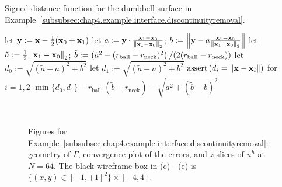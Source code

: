 \begin{algorithm}[htbp]
\caption{Signed distance function for the dumbbell surface in Example~\ref{subsubsec:chap4.example.interface.discontinuityremoval}.}
\label{alg:chap4.examples.interface.dumbbell}
\begin{algorithmic}[1]
\STATE {}
\STATE {}
\STATE let $\mathbf{y} := \mathbf{x} - \frac{1}{2} (\mathbf{x}_0 + \mathbf{x}_1)$
\STATE {}
\STATE let $a := \mathbf{y} \cdot \frac{\mathbf{x}_1 - \mathbf{x}_0}{\left\lVert \mathbf{x}_1 - \mathbf{x}_0 \right\rVert_2}$; $b := \left\lVert \mathbf{y} - a \frac{\mathbf{x}_1 - \mathbf{x}_0}{\left\lVert \mathbf{x}_1 - \mathbf{x}_0 \right\rVert_2} \right\rVert$
\STATE let $\tilde{a} := \frac{1}{2} \left\lVert \mathbf{x}_1 - \mathbf{x}_0 \right\rVert_2$; $\tilde{b} := \left( \tilde{a}^2 - (r_{\text{ball}} - r_{\text{neck}})^2 \right) / (2 (r_{\text{ball}} - r_{\text{neck}}))$
    \STATE let $d_0 := \sqrt{(\tilde{a} + a)^2 + b^2}$ 
    \STATE let $d_1 := \sqrt{(\tilde{a} - a)^2 + b^2}$ 
    \STATE $\operatorname{assert} \left( d_i = \left\lVert \mathbf{x} - \mathbf{x}_i \right\rVert \right)$ for $i = 1,2$
    \RETURN $\min \{d_0, d_1\} - r_{\text{ball}}$
\ELSE
    \RETURN $(\tilde{b} - r_{\text{neck}}) - \sqrt{a^2 + (\tilde{b} - b)^2}$
\ENDIF
\end{algorithmic}
\end{algorithm}

\setlength{\figureheighti}{0.43\textwidth}
\setlength{\figurewidthii}{0.33\textwidth}
\begin{figure}[htbp]
\centering
{}
 \\
\caption{Figures for Example~\ref{subsubsec:chap4.example.interface.discontinuityremoval}: geometry of $\Gamma$, convergence plot of the errors, and $z$-slices of $u^h$ at $N = 64$. The black wireframe box in (c) - (e) is $\{(x,y) \in [-1,+1]^2\} \times [-4,4]$.}
\label{fig:chap4.example.interface.discontinuityremoval}
\end{figure}

